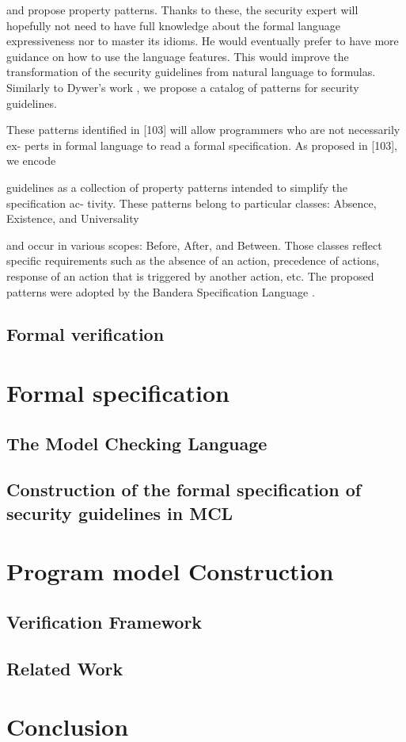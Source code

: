 \documentclass[10pt]{article}
\begin{document}
and propose property patterns. Thanks to these, the security expert will hopefully not
need to have full knowledge about the formal language expressiveness nor to master its
idioms. He would eventually prefer to have more guidance on how to use the language
features. This would improve the transformation of the security guidelines from natural
language to formulas.
Similarly to Dywer’s work \cite{Dwyer::1999}, we propose a catalog of patterns for security guidelines.

These patterns identified in [103] will allow programmers who are not necessarily ex-
perts in formal language to read a formal specification. As proposed in [103], we encode

guidelines as a collection of property patterns intended to simplify the specification ac-
tivity. These patterns belong to particular classes: Absence, Existence, and Universality

and occur in various scopes: Before, After, and Between. Those classes reflect specific
requirements such as the absence of an action, precedence of actions, response of an
action that is triggered by another action, etc. The proposed patterns were adopted by
the Bandera Specification Language \cite{corbett2002expressing}.


\subsection {Formal verification}
\section{Formal specification}
\subsection {The Model Checking Language}
\subsection {Construction of the formal specification of security guidelines in MCL}
\section{Program model Construction}
\subsection {Verification Framework}
\subsection {Related Work}
\section{Conclusion}


\end{document}
